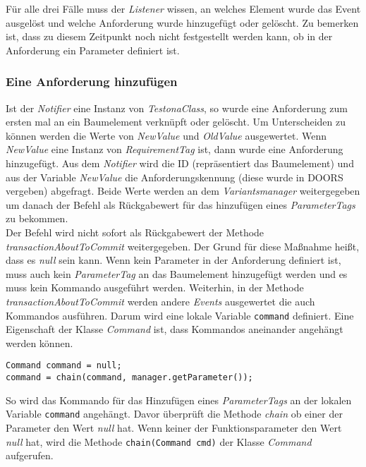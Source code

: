 Für alle drei Fälle muss der \textit{Listener} wissen, an welches Element wurde das Event ausgelöst und welche Anforderung wurde hinzugefügt oder gelöscht. Zu bemerken ist, dass zu diesem Zeitpunkt noch nicht festgestellt werden kann, ob in der Anforderung ein Parameter definiert ist.\\


\subsubsection{Eine Anforderung hinzufügen}
Ist der \textit{Notifier} eine Instanz von \textit{TestonaClass}, so wurde eine Anforderung zum ersten mal an ein Baumelement verknüpft oder gelöscht. Um Unterscheiden zu können werden die Werte von \textit{NewValue} und \textit{OldValue} ausgewertet. Wenn \textit{NewValue} eine Instanz von \textit{RequirementTag} ist, dann wurde eine Anforderung hinzugefügt. Aus dem \textit{Notifier} wird die ID (repräsentiert das Baumelement) und aus der Variable \textit{NewValue} die Anforderungskennung (diese wurde in DOORS vergeben) abgefragt. Beide Werte werden an dem \textit{Variantsmanager} weitergegeben um danach der Befehl als Rückgabewert für das hinzufügen eines \textit{ParameterTags} zu bekommen.\\


Der Befehl wird nicht sofort als Rückgabewert der Methode \textit{transactionAboutToCommit} weitergegeben. Der Grund für diese Maßnahme heißt, dass es \textit{null} sein kann. Wenn kein Parameter in der Anforderung definiert ist, muss auch kein \textit{ParameterTag} an das Baumelement hinzugefügt werden und es muss kein Kommando ausgeführt werden. Weiterhin, in der Methode \textit{transactionAboutToCommit} werden andere \textit{Events} ausgewertet die auch Kommandos ausführen. Darum wird eine lokale Variable \texttt{command} definiert. Eine Eigenschaft der Klasse \textit{Command} ist, dass Kommandos aneinander angehängt werden können.

\begin{lstlisting}
Command command = null;
command = chain(command, manager.getParameter());
\end{lstlisting}

So wird das Kommando für das Hinzufügen eines \textit{ParameterTags} an der lokalen Variable \texttt{command} angehängt. Davor überprüft die Methode \textit{chain} ob einer der Parameter den Wert \textit{null} hat. Wenn keiner der Funktionsparameter den Wert \textit{null} hat, wird die Methode \texttt{chain(Command cmd)} der Klasse \textit{Command} aufgerufen.

